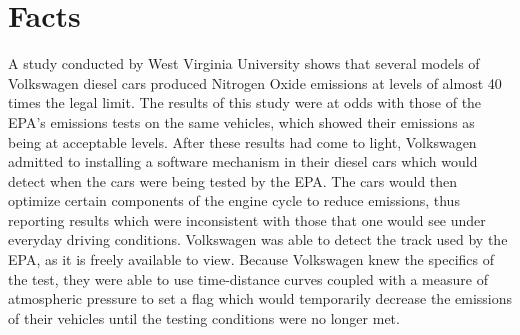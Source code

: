 \section{Facts}
A study\cite{study} conducted by West Virginia University shows that several models of Volkswagen diesel cars\cite{emissions_cars_affected} produced Nitrogen Oxide emissions at levels of almost 40 times the legal limit\cite{study}. The results of this study were at odds with those of the EPA's emissions tests\cite{study} on the same vehicles, which showed their emissions as being at acceptable levels. After these results had come to light, Volkswagen admitted\cite{course_detection} to installing a software mechanism in their diesel cars which would detect when the cars were being tested by the EPA. The cars would then optimize certain components of the engine cycle to reduce emissions, thus reporting results which were inconsistent with those that one would see under everyday driving conditions. Volkswagen was able to detect the track used by the EPA, as it is freely available to view\cite{epa_track}. Because Volkswagen knew the specifics of the test, they were able to use time-distance curves\cite{cheating_analysis} coupled with a measure of atmospheric pressure to set a flag which would temporarily decrease the emissions of their vehicles until the testing conditions were no longer met.